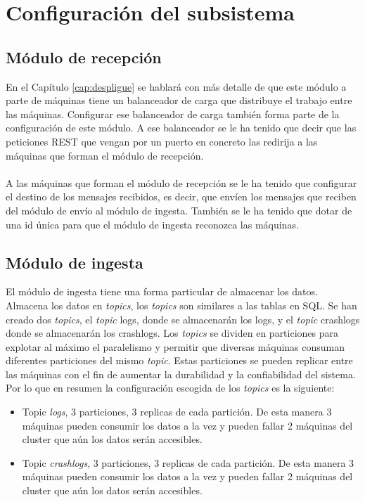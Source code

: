 \section{Configuración del subsistema}

\subsection{Módulo de recepción}

En el Capítulo \ref{cap:despligue} se hablará con más detalle de que este módulo a parte de máquinas tiene un balanceador de carga que distribuye el trabajo entre las máquinas. Configurar ese balanceador de carga también forma parte de la configuración de este módulo. A ese balanceador se le ha tenido que decir que las peticiones REST que vengan por un puerto en concreto las redirija a las máquinas que forman el módulo de recepción.
\\\\
A las máquinas que forman el módulo de recepción se le ha tenido que configurar el destino de los mensajes recibidos, es decir, que envíen los mensajes que reciben del módulo de envío al módulo de ingesta. También se le ha tenido que dotar de una id única para que el módulo de ingesta reconozca las máquinas.

\subsection{Módulo de ingesta}

El módulo de ingesta tiene una forma particular de almacenar los datos. Almacena los datos en \textit{topics}, los \textit{topics} son similares a las tablas en SQL. Se han creado dos \textit{topics}, el \textit{topic} logs, donde se almacenarán los logs, y el \textit{topic} crashlogs donde se almacenarán los crashlogs. Los \textit{topics} se dividen en particiones para explotar al máximo el paralelismo y permitir que diversas máquinas consuman diferentes particiones del mismo \textit{topic}. Estas particiones se pueden replicar entre las máquinas con el fin de aumentar la durabilidad y la confiabilidad del sistema. Por lo que en resumen la configuración escogida de los \textit{topics} es la siguiente:

\begin{itemize}
	\item Topic \textit{logs}, 3 particiones, 3 replicas de cada partición. De esta manera 3 máquinas pueden consumir los datos a la vez y pueden fallar 2 máquinas del cluster que aún los datos serán accesibles.
	\item Topic \textit{crashlogs}, 3 particiones, 3 replicas de cada partición. De esta manera 3 máquinas pueden consumir los datos a la vez y pueden fallar 2 máquinas del cluster que aún los datos serán accesibles.
\end{itemize}

